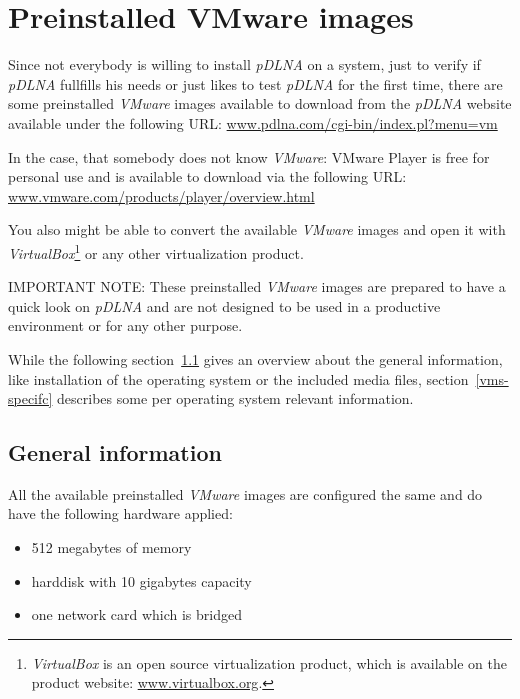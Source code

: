\documentclass[a4paper,oneside,10pt]{report}
\newenvironment{colframeimportantnote}{%
  \begin{Sbox}
    \begin{minipage}{.99\columnwidth}
}{%
  \end{minipage}
  \end{Sbox}
  \begin{center}
    \fcolorbox{black}{Orange}{\TheSbox}
  \end{center}
}
\begin{document}
%
%

\chapter{Preinstalled VMware images}
\label{vms}

Since not everybody is willing to install {\em pDLNA} on a system, just to verify if {\em pDLNA} fullfills his needs or just likes to test {\em pDLNA} for the first time, there are some preinstalled {\em VMware} images available to download from the {\em pDLNA} website available under the following URL: \url{www.pdlna.com/cgi-bin/index.pl?menu=vm}

In the case, that somebody does not know {\em VMware}: VMware Player is free for personal use and is available to download via the following URL: \url{www.vmware.com/products/player/overview.html}

You also might be able to convert the available {\em VMware} images and open it with {\em VirtualBox}\footnote{{\em VirtualBox} is an open source virtualization product, which is available on the product website: \url{www.virtualbox.org}.} or any other virtualization product.

\begin{colframeimportantnote}
\textsc{IMPORTANT NOTE:} These preinstalled {\em VMware} images are prepared to have a quick look on {\em pDLNA} and are not designed to be used in a productive environment or for any other purpose.
\end{colframeimportantnote}

While the following section~\ref{vms-general} gives an overview about the general information, like installation of the operating system or the included media files, section~\ref{vms-specifc} describes some per operating system relevant information.

\section{General information}
\label{vms-general}

All the available preinstalled {\em VMware} images are configured the same and do have the following hardware applied:
\begin{itemize}
	\item 512 megabytes of memory
	\item harddisk with 10 gigabytes capacity
	\item one network card which is bridged
\end{itemize}
\end{document}
